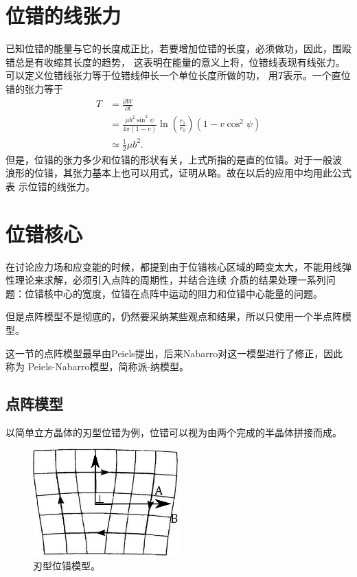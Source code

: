        \section{位错的线张力}
            已知位错的能量与它的长度成正比，若要增加位错的长度，必须做功，因此，围殴错总是有收缩其长度的趋势，
            这表明在能量的意义上将，位错线表现有线张力。可以定义位错线张力等于位错线伸长一个单位长度所做的功，
            用$T$表示。一个直位错的张力等于
            \begin{equation}
                \begin{aligned}
                    T&=\frac{\partial W}{\partial l}\\
                    &=\frac{\mu b^{2} \sin ^{2} \psi}{4 \pi(1-v)} \ln \left(\frac{r_{1}}{r_{0}}\right)\left(1-v \cos ^{2} \psi\right)\\
                    &\simeq \frac{1}{2}\mu b^2.
                \end{aligned}
            \end{equation}
            但是，位错的张力多少和位错的形状有关，上式所指的是直的位错。对于一般波
            浪形的位错，其张力基本上也可以用式，证明从略。故在以后的应用中均用此公式表
            示位错的线张力。
        \section{位错核心}
            在讨论应力场和应变能的时候，都提到由于位错核心区域的畸变太大，不能用线弹性理论来求解，必须引入点阵的周期性，并结合连续
            介质的结果处理一系列问题：位错核中心的宽度，位错在点阵中运动的阻力和位错中心能量的问题。

            但是点阵模型不是彻底的，仍然要采纳某些观点和结果，所以只使用一个半点阵模型。

            这一节的点阵模型最早由Peiels提出，后来Nabarro对这一模型进行了修正，因此称为
            Peiels-Nabarro模型，简称派-纳模型。
            \subsection{点阵模型}
                以简单立方晶体的刃型位错为例，位错可以视为由两个完成的半晶体拼接而成。
                \begin{figure}[ht]
                    \centering
                    \includegraphics[width=0.5\textwidth]{fig/coordinate_in_edge_dislocation.eps}
                    \caption{刃型位错模型。}
                    \label{刃型位错模型}
                \end{figure}

